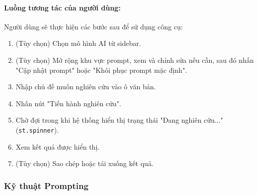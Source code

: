 \paragraph{Luồng tương tác của người dùng:} Người dùng sẽ thực hiện các bước sau để sử dụng công cụ:
\begin{enumerate}
    \item (Tùy chọn) Chọn mô hình AI từ sidebar.

    \item (Tùy chọn) Mở rộng khu vực prompt, xem và chỉnh sửa nếu cần, sau đó nhấn "Cập nhật prompt" hoặc "Khôi phục prompt mặc định".
    
    \item Nhập chủ đề muốn nghiên cứu vào ô văn bản.
    
    \item Nhấn nút "Tiến hành nghiên cứu".
    
    \item Chờ đợi trong khi hệ thống hiển thị trạng thái "Đang nghiên cứu..." (\texttt{st.spinner}).
    
    \item Xem kết quả được hiển thị.
    
    \item (Tùy chọn) Sao chép hoặc tải xuống kết quả.
\end{enumerate}

\subsubsection{Kỹ thuật Prompting}

